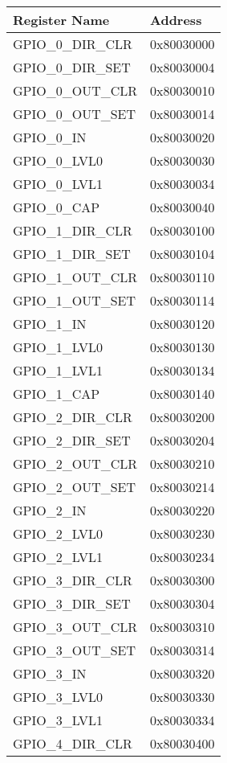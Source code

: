 \begin{table}[h]
	{
		\begin{small}
			\begin{center}
	\begin{tabular}{l | l}
		Register Name & Address\\ \hline \hline
GPIO\_0\_DIR\_CLR    & 0x80030000\\
GPIO\_0\_DIR\_SET    & 0x80030004\\
GPIO\_0\_OUT\_CLR    & 0x80030010\\
GPIO\_0\_OUT\_SET    & 0x80030014\\
GPIO\_0\_IN         & 0x80030020\\
GPIO\_0\_LVL0       & 0x80030030\\
GPIO\_0\_LVL1       & 0x80030034\\
GPIO\_0\_CAP        & 0x80030040\\
GPIO\_1\_DIR\_CLR    & 0x80030100\\
GPIO\_1\_DIR\_SET    & 0x80030104\\
GPIO\_1\_OUT\_CLR    & 0x80030110\\
GPIO\_1\_OUT\_SET    & 0x80030114\\
GPIO\_1\_IN         & 0x80030120\\
GPIO\_1\_LVL0       & 0x80030130\\
GPIO\_1\_LVL1       & 0x80030134\\
GPIO\_1\_CAP        & 0x80030140\\
GPIO\_2\_DIR\_CLR    & 0x80030200\\
GPIO\_2\_DIR\_SET    & 0x80030204\\
GPIO\_2\_OUT\_CLR    & 0x80030210\\
GPIO\_2\_OUT\_SET    & 0x80030214\\
GPIO\_2\_IN         & 0x80030220\\
GPIO\_2\_LVL0       & 0x80030230\\
GPIO\_2\_LVL1       & 0x80030234\\
GPIO\_3\_DIR\_CLR    & 0x80030300\\
GPIO\_3\_DIR\_SET    & 0x80030304\\
GPIO\_3\_OUT\_CLR    & 0x80030310\\
GPIO\_3\_OUT\_SET    & 0x80030314\\
GPIO\_3\_IN         & 0x80030320\\
GPIO\_3\_LVL0       & 0x80030330\\
GPIO\_3\_LVL1       & 0x80030334\\
GPIO\_4\_DIR\_CLR    & 0x80030400\\

\end{tabular}
\end{center}
\end{small}}
\end{table}
